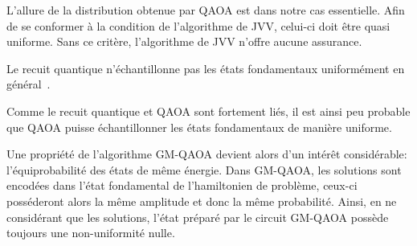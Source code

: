 L'allure de la distribution obtenue par QAOA est dans notre cas essentielle. Afin de se conformer à la condition de l'algorithme de JVV, celui-ci doit être quasi uniforme. Sans ce critère, l'algorithme de JVV n'offre aucune assurance.

Le recuit quantique n'échantillonne pas les états fondamentaux uniformément en général~\cite{matsudaGroundstateStatisticsAnnealing2009, mandraExponentiallyBiasedGroundState2017}. 


Comme le recuit quantique et QAOA sont fortement liés, il est ainsi peu probable que QAOA puisse échantillonner les états fondamentaux de manière uniforme.


Une propriété de l'algorithme GM-QAOA devient alors d'un intérêt considérable: l'équiprobabilité des états de même énergie. Dans GM-QAOA, les solutions sont encodées dans l'état fondamental de l'hamiltonien de problème, ceux-ci posséderont alors la même amplitude et donc la même probabilité. Ainsi, en ne considérant que les solutions, l'état préparé par le circuit GM-QAOA possède toujours une non-uniformité nulle. 
